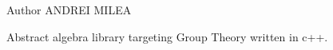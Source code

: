 \begin{DoxyAuthor}{Author}
A\-N\-D\-R\-E\-I M\-I\-L\-E\-A
\end{DoxyAuthor}
Abstract algebra library targeting Group Theory written in c++. 